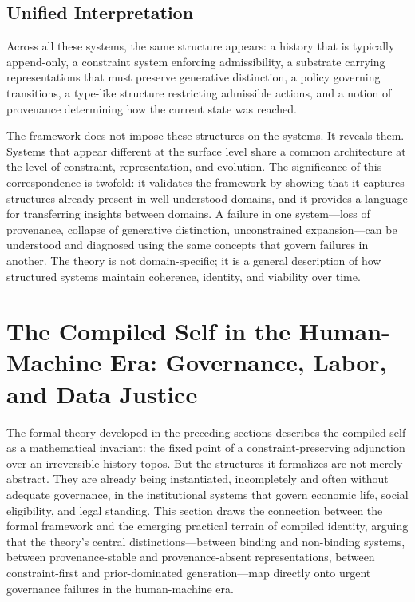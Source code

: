 \documentclass[12pt, a4paper]{article}
\theoremstyle{plain}
\theoremstyle{definition}
\theoremstyle{remark}
\begin{document}
\subsection{Unified Interpretation}

Across all these systems, the same structure appears: a history that is typically append-only, a constraint system enforcing admissibility, a substrate carrying representations that must preserve generative distinction, a policy governing transitions, a type-like structure restricting admissible actions, and a notion of provenance determining how the current state was reached.

The framework does not impose these structures on the systems. It reveals them. Systems that appear different at the surface level share a common architecture at the level of constraint, representation, and evolution. The significance of this correspondence is twofold: it validates the framework by showing that it captures structures already present in well-understood domains, and it provides a language for transferring insights between domains. A failure in one system---loss of provenance, collapse of generative distinction, unconstrained expansion---can be understood and diagnosed using the same concepts that govern failures in another. The theory is not domain-specific; it is a general description of how structured systems maintain coherence, identity, and viability over time.

\section{The Compiled Self in the Human-Machine Era: Governance, Labor, and Data Justice}

The formal theory developed in the preceding sections describes the compiled self as a mathematical invariant: the fixed point of a constraint-preserving adjunction over an irreversible history topos. But the structures it formalizes are not merely abstract. They are already being instantiated, incompletely and often without adequate governance, in the institutional systems that govern economic life, social eligibility, and legal standing. This section draws the connection between the formal framework and the emerging practical terrain of compiled identity, arguing that the theory's central distinctions---between binding and non-binding systems, between provenance-stable and provenance-absent representations, between constraint-first and prior-dominated generation---map directly onto urgent governance failures in the human-machine era.
\end{document}
